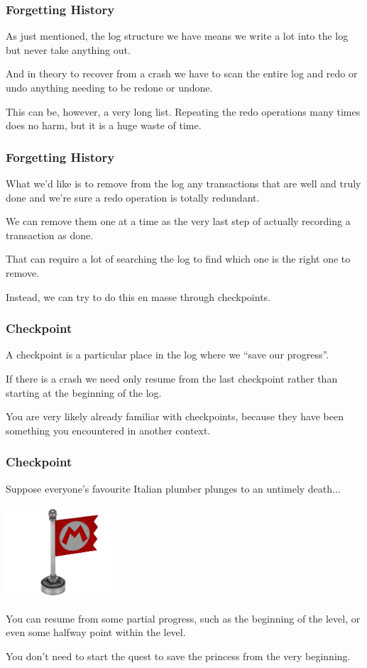 \begin{frame}
\frametitle{Forgetting History}

As just mentioned, the log structure we have means we write a lot into the log but never take anything out. 

And in theory to recover from a crash we have to scan the entire log and redo or undo anything needing to be redone or undone. 

This can be, however, a very long list. Repeating the redo operations many times does no harm, but it is a huge waste of time.

\end{frame}

\begin{frame}
\frametitle{Forgetting History}
What we'd like is to remove from the log any transactions that are well and truly done and we're sure a redo operation is totally redundant. 

We can remove them one at a time as the very last step of actually recording a transaction as done. 

That can require a lot of searching the log to find which one is the right one to remove. 

Instead, we can try to do this en masse through \alert{checkpoints}.


\end{frame}


\begin{frame}
\frametitle{Checkpoint}

A checkpoint is a particular place in the log where we ``save our progress''. 

If there is a crash we need only resume from the last checkpoint rather than starting at the beginning of the log. 

You are very likely already familiar with checkpoints, because they have been something you encountered in another context. 

\end{frame}


\begin{frame}
\frametitle{Checkpoint}


Suppose everyone's favourite Italian plumber plunges to an untimely death... 

\begin{center}
	\includegraphics[width=0.3\textwidth]{images/checkpoint-flag.png}
\end{center}

You can resume from some partial progress, such as the beginning of the level, or even some halfway point within the level.

You don't need to start the quest to save the princess from the very beginning.


\end{frame}

